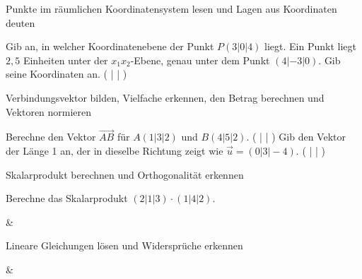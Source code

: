 \setcounter{aufgabe}{0}

\begin{aufgabe}{Punkte im räumlichen Koordinatensystem lesen und Lagen aus Koordinaten deuten}
\begin{teile}
\teil Gib an, in welcher Koordinatenebene der Punkt $P(3 | 0 | 4)$ liegt.
\teil Ein Punkt liegt $2{,}5$ Einheiten unter der $x_1x_2$-Ebene, genau unter dem Punkt $(4 | -3 | 0)$. Gib seine Koordinaten an. ( \leerfeld | \leerfeld | \leerfeld )
\end{teile}
\end{aufgabe}

\begin{aufgabe}{Verbindungsvektor bilden, Vielfache erkennen, den Betrag berechnen und Vektoren normieren}
\begin{teile}
\teil Berechne den Vektor $\overrightarrow{AB}$ für $A(1 | 3 | 2)$ und $B(4 | 5 | 2)$. ( \leerfeld | \leerfeld | \leerfeld )
\teil Gib den Vektor der Länge 1 an, der in dieselbe Richtung zeigt wie $\vec u = (0 | 3 | -4)$. ( \leerfeld | \leerfeld | \leerfeld )
\end{teile}
\end{aufgabe}

\begin{aufgabe}{Skalarprodukt berechnen und Orthogonalität erkennen}
\begin{teile}
\teil Berechne das Skalarprodukt $(2 | 1 | 3) \cdot (1 | 4 | 2)$.
\end{teile}
\begin{gleichungsraster}[2]
 & \\
\end{gleichungsraster}
\end{aufgabe}

\begin{aufgabe}{Lineare Gleichungen lösen und Widersprüche erkennen}
\begin{gleichungsraster}[2]
 &
 \\
\end{gleichungsraster}
\end{aufgabe}

